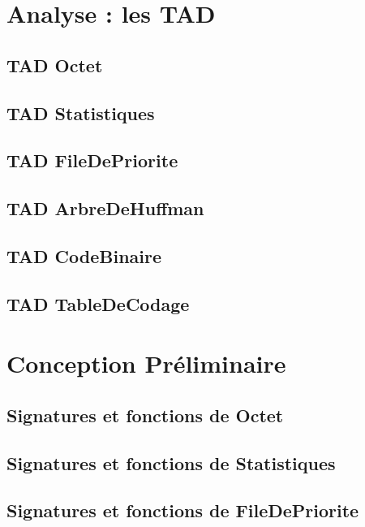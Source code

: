 \section{Analyse : les TAD}
            \subsection{TAD Octet}
                
            \subsection{TAD Statistiques}
                
            \subsection{TAD FileDePriorite}
                
            \subsection{TAD ArbreDeHuffman}
                
            \subsection{TAD CodeBinaire}
                
            \subsection{TAD TableDeCodage}
                

        \newpage
        \section{Conception Préliminaire}
            \subsection{Signatures et fonctions de Octet}
                
            \subsection{Signatures et fonctions de Statistiques}
                
            \subsection{Signatures et fonctions de FileDePriorite}
                
